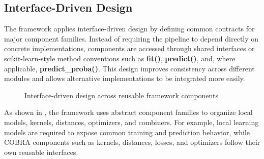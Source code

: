 
\subsection{Interface-Driven Design}

\hs The framework applies interface-driven design by defining common contracts for major component families. Instead of requiring the pipeline to depend directly on concrete implementations, components are accessed through shared interfaces or scikit-learn-style method conventions such as \textbf{fit()}, \textbf{predict()}, and, where applicable, \textbf{predict\_proba()}. This design improves consistency across different modules and allows alternative implementations to be integrated more easily.

\begin{figure}[H]
      \centering
      \caption{Interface-driven design across reusable framework components}
      \label{fig:interface-driven-design}
\end{figure}

As shown in , the framework uses abstract component families to organize local models, kernels, distances, optimizers, and combiners. For example, local learning models are required to expose common training and prediction behavior, while COBRA components such as kernels, distances, losses, and optimizers follow their own reusable interfaces.


